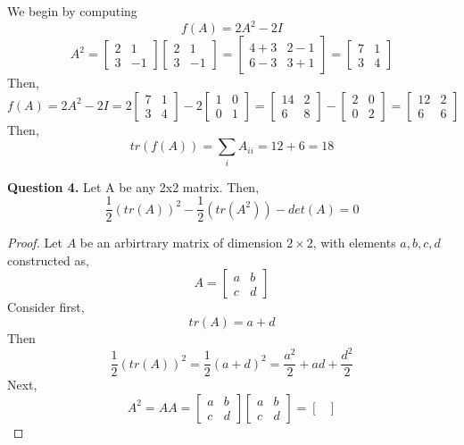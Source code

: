 \documentclass[letterpaper,10pt]{article}
\begin{document}
\begin{description}
\begin{enumerate}[label=\alph*.]
We begin by computing
\[f(A)=2A^2-2I\]
\[A^2=\begin{bmatrix}
2 & 1 \\
3 & -1
\end{bmatrix} \begin{bmatrix}
2 & 1 \\
3 & -1
\end{bmatrix}=\begin{bmatrix}
4+3 & 2-1 \\
6-3 & 3+1
\end{bmatrix}=\begin{bmatrix}
7 & 1\\
3 & 4
\end{bmatrix} \]
Then,
\[f(A)=2A^2-2I=2\begin{bmatrix}
7 & 1\\
3 & 4
\end{bmatrix}-2\begin{bmatrix}
1 & 0\\
0 & 1
\end{bmatrix}=\begin{bmatrix}
14 & 2\\
6 & 8
\end{bmatrix}-\begin{bmatrix}
2 & 0\\
0 & 2
\end{bmatrix}=\begin{bmatrix}
12 & 2\\
6 & 6
\end{bmatrix} \]
Then,
\[tr(f(A))=\sum_iA_{ii}=12+6=18\]
\end{enumerate}
\item \textbf{Question 4.}
Let A be any 2x2 matrix. Then,
\[\frac{1}{2}(tr(A))^2-\frac{1}{2}(tr(A^2))-det(A)=0\]
\begin{proof}
Let $A$ be an arbirtrary matrix of dimension $2\times2$, with elements $a,b,c,d$ constructed as,
\[A=\begin{bmatrix}
a & b\\
c & d
\end{bmatrix}\]
Consider first,
\[tr(A)=a+d\]
Then
\[\frac{1}{2}(tr(A))^2=\frac{1}{2}(a+d)^2=\frac{a^2}{2}+ad+\frac{d^2}{2}\]
Next,
\[A^2=AA=\begin{bmatrix}
a & b\\
c & d
\end{bmatrix}\begin{bmatrix}
a & b\\
c & d
\end{bmatrix}=\begin{bmatrix}

\end{bmatrix}\]
\end{proof}
\end{description}
\end{document}
